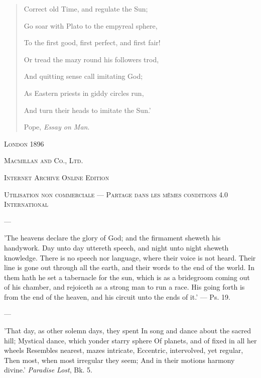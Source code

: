 \documentclass[a4paper, 11pt, oneside, polutonikogreek, english]{article}
\begin{document}
\begin{titlepage}
\begin{quotation}
Correct old Time, and regulate the Sun;

Go soar with Plato to the empyreal sphere,

To the first good, first perfect, and first fair!

Or tread the mazy round his followers trod,

And quitting sense call imitating God;

As Eastern priests in giddy circles run,

And turn their heads to imitate the Sun.'

Pope, \emph{Essay on Man}.
        \end{quotation}
  
    \vspace*{\fill}

	\vspace{1\baselineskip}

	{\small\scshape London 1896}
	
	{\small\scshape{Macmillan and Co., Ltd.}}
	
	\vspace{0.5\baselineskip} %

    \scshape Internet Archive Online Edition  %
	
	{\scshape\small Utilisation non commerciale --- Partage dans les mêmes conditions 4.0 International} %
\end{titlepage}
\setlength{\parskip}{1mm plus1mm minus1mm}
\clearpage
\tableofcontents
\clearpage
\listoffigures
\clearpage

---

'The heavens declare the glory of God; and the firmament sheweth his handywork. Day unto day uttereth speech, and night unto night sheweth knowledge. There is no speech nor language, where their voice is not heard. Their line is gone out through all the earth, and their words to the end of the world. In them hath he set a tabernacle for the sun, which is as a bridegroom coming out of his chamber, and rejoiceth as a strong man to run a race. His going forth is from the end of the heaven, and his circuit unto the ends of it.' --- Ps. 19.

---

'That day, as other solemn days, they spent  
In song and dance about the sacred hill;  
Mystical dance, which yonder starry sphere  
Of planets, and of fixed in all her wheels  
Resembles nearest, mazes intricate,  
Eccentric, intervolved, yet regular,  
Then most, when most irregular they seem;  
And in their motions harmony divine.'  
\emph{Paradise Lost}, Bk. 5.
\end{document}
